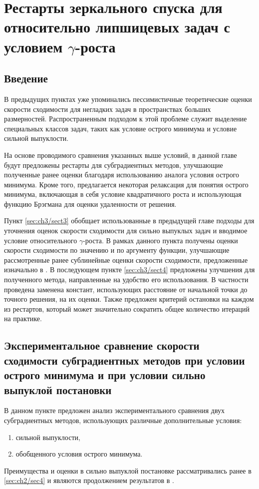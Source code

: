 \chapter{Рестарты зеркального спуска для относительно липшицевых задач с условием $\gamma$-роста}\label{ch:ch3}

\section{Введение}\label{sec:ch3/sect1}

    В предыдущих пунктах уже упоминались пессимистичные теоретические оценки скорости сходимости для негладких задач в пространствах больших размерностей. Распространенным подходом к этой проблеме служит выделение специальных классов задач, таких как условие острого минимума \cite{6, 1} и условие сильной выпуклости. 

    На основе проводимого сравнения указанных выше условий, в данной главе будут предложены рестарты для субградиентных методов, улучшающие полученные ранее оценки благодаря использованию аналога условия острого минимума.  Кроме того, предлагается некоторая релаксация для понятия острого минимума, включающая в себя условие квадратичного роста и использующая функцию Брэгмана для оценки удаленности от решения. 
    
    Пункт \ref{sec:ch3/sect3} обобщает использованные в предыдущей главе подходы для уточнения оценок скорости сходимости для сильно выпуклых задач и вводимое условие относительного $\gamma$-роста. В рамках данного пункта получены оценки скорости сходимости по значению и по аргументу функции, улучшающие рассмотренные ранее сублинейные оценки скорости сходимости, предложенные изначально в \cite{Bach_2012}. В последующем пункте \ref{sec:ch3/sect4} предложены улучшения для полученного метода, направленные на удобство его использования. В частности проведена заменена констант, использующих расстояние от начальной точки до точного решения, на их оценки. Также предложен критерий остановки на каждом из рестартов, который может значительно сократить общее количество итераций на практике.

 \section{Экспериментальное сравнение скорости сходимости субградиентных методов при условии острого минимума и при условии сильно выпуклой постановки}  \label{sec:ch3/sec2}

    В данном пункте предложен анализ экспериментального сравнения двух субградиентных методов, использующих различные дополнительные условия:
    \begin{enumerate}
        \item сильной выпуклости,
        \item обобщенного условия острого минимума.
    \end{enumerate}
    Преимущества и оценки в сильно выпуклой постановке рассматривались ранее в \ref{sec:ch2/sec4} и являются продолжением результатов в \cite{Bach_2012}.

